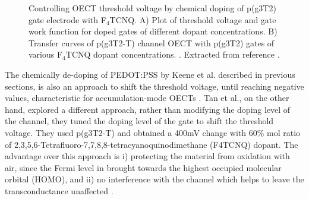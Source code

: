  \begin{figure}[h]
	\centering
	\hspace{2em}
	\caption{Controlling OECT threshold voltage by chemical doping of p(g3T2) gate electrode with F$_{4}$TCNQ. A) Plot of threshold voltage and gate work function for doped gates of different dopant concentrations. B) Transfer curves of p(g3T2-T) channel OECT %
		with p(g3T2) gates of various F$_{4}$TCNQ dopant concentrations. . Extracted from reference \cite{tanTuningOrganicElectrochemical2022}.}
	\label{fig:gmuc}
\end{figure}

The chemically de-doping of PEDOT:PSS by Keene et al. described in previous sections, is also an approach to shift the threshold voltage, until reaching negative values, characteristic for accumulation-mode OECTs \cite{keeneEnhancementModePEDOTPSS2020}. Tan et al., on the other hand, explored a different approach, rather than modifying the doping level of the channel, they tuned the doping level of the gate to shift the threshold voltage. They used p(g3T2-T) and obtained a 400mV change with 60\% mol ratio of 2,3,5,6-Tetrafluoro-7,7,8,8-tetracyanoquinodimethane (F4TCNQ) dopant. The advantage over this approach is i) protecting the material from oxidation with air, since the Fermi level in brought towards the highest occupied molecular orbital (HOMO), and ii) no interference with the channel which helps to leave the transconductance unaffected \cite{tanTuningOrganicElectrochemical2022}.


